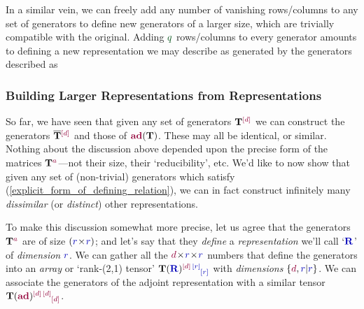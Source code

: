 \documentclass[12pt,a4paper]{article}\let\ifpdf\relax
\begin{document}
In a similar vein, we can freely add any number of vanishing rows/columns to any set of generators to define new generators of a larger size, which are trivially compatible with the original. Adding $\g{q}$ rows/columns to every generator amounts to defining a new representation we may describe as generated by the generators described as
%
%

\newpage
\subsubsection[Building Larger Representations from Representations]{Building Larger Representations from Representations}\vspace{-4pt}

So far, we have seen that given any set of generators $\mathbf{T}\indices{\r{[d]}}{}$ we can construct the generators $\mathbf{\bar{T}}\indices{\r{[d]}}{}$ and those of $\mathbf{\r{ad}}(\mathbf{T})$. These may all be identical, or similar. Nothing about the discussion above depended upon the precise form of the matrices $\mathbf{T}^\r{a}$---not their size, their `reducibility', etc. We'd like to now show that given any set of (non-trivial) generators which satisfy (\ref{explicit_form_of_defining_relation}), we can in fact construct infinitely many \emph{dissimilar} (or \emph{distinct}) other representations. 

To make this discussion somewhat more precise, let us agree that the generators $\mathbf{T}^{\r{a}}$ are of size $(\b{r}\!\times\!\b{r})$; and let's say that they \emph{define} a \emph{representation} we'll call `$\mathbf{\b{R}}$' of \emph{dimension} $\b{r}$. We can gather all the $\r{d}\!\times\!\b{r}\!\times\!\b{r}$ numbers that define the generators into an \emph{array} or `rank-(2,1) tensor' $\mathbf{T}(\mathbf{\b{R}})\indices{\r{[d]}\,\b{[r]}}{\b{[r]}}$ with \emph{dimensions} $\{\r{d},\b{r}|\b{r}\}$. We can associate the generators of the adjoint representation with a similar tensor $\mathbf{T}(\r{\mathbf{ad}})\indices{\r{[d]\,[d]}}{\r{[d]}}$. 
\end{document}
